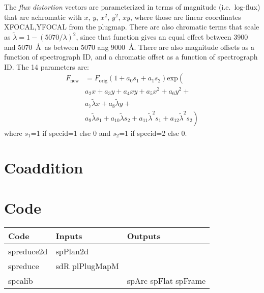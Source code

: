 \documentclass[12pt]{article}
\begin{document}
The {\it flux distortion} vectors are parameterized in terms of magnitude
(i.e.~log-flux) that are achromatic with $x$, $y$, $x^2$, $y^2$, $xy$,
where those are linear coordinates XFOCAL,YFOCAL from the plugmap.
There are also chromatic terms that scale as
$\tilde \lambda = 1-(5070/\lambda)^2$,
since that function gives an equal effect between 3900 and 5070~\AA\
as between 5070 ang 9000~\AA.
There are also magnitude offsets as a function of spectrograph ID,
and a chromatic offset as a function of spectrograph ID.  The 14 parameters are:
\begin{equation}
\begin{split}
    F_\mathrm{new} &= F_\mathrm{orig}
        \left(1 + a_0 s_1 + a_1 s_2 \right) \mathrm{exp} \left( \right. \\
&            a_2 x + a_3 y + a_4 x y + a_5 x^2 + a_6 y^2 + \\
&            a_7 \tilde \lambda x + a_8 \tilde \lambda y + \\
&             a_9 \tilde \lambda s_1 + a_{10} \tilde \lambda s_2 +
             a_{11} \tilde \lambda^2 s_1 + a_{12} \tilde \lambda^2 s_2
        \left. \right)
\end{split}
\end{equation}
where $s_1$=1 if specid=1 else 0 and $s_2$=1 if specid=2 else 0.

\section{Coaddition}

\section{Code}

\begin{tabular}{lp{30mm}p{30mm}}
Code & Inputs & Outputs \\
\hline
spreduce2d  & spPlan2d  & \\
\hline
  spreduce    & sdR \newline plPlugMapM & \\
\hline
    spcalib     &       & spArc \newline spFlat \newline spFrame \\
\end{tabular}
\end{document}
